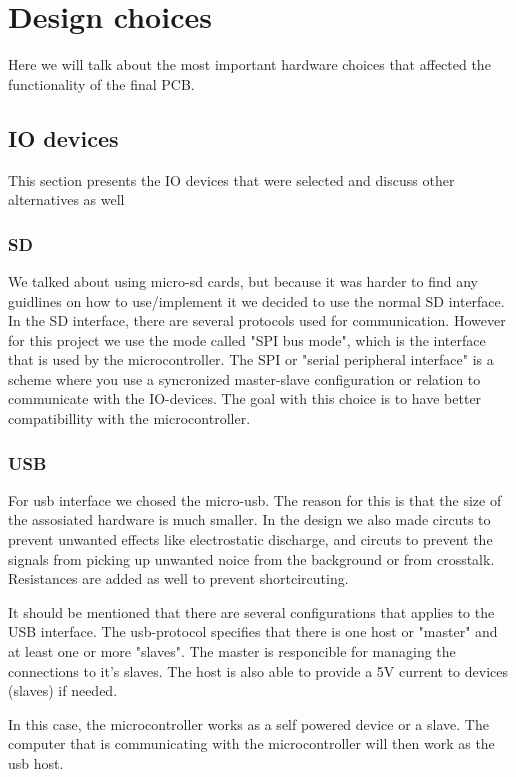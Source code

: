 \section {Design choices}

Here we will talk about the most important hardware choices that affected the functionality of the final PCB.

\subsection{IO devices} \label{pcb:design-choices:ss:IO_devices}
This section presents the IO devices that were selected and discuss other alternatives as well

\subsubsection{SD}
We talked about using micro-sd cards, but because it was harder to find any guidlines on how to use/implement it we decided to use the normal SD interface.
In the SD interface, there are several protocols used for communication. 
However for this project we use the mode called "SPI bus mode", which is the interface that is used by the microcontroller.  
The SPI or "serial peripheral interface" is a scheme where you use a syncronized master-slave configuration or relation to communicate with the IO-devices. 
The goal with this choice is to have better compatibillity with the microcontroller.

\subsubsection{USB}
For usb interface we chosed the micro-usb. 
The reason for this is that the size of the assosiated hardware is much smaller.
In the design we also made circuts to prevent unwanted effects like electrostatic discharge, and circuts to prevent the signals from picking up unwanted noice from the background or from crosstalk.
Resistances are added as well to prevent shortcircuting.

It should be mentioned that there are several configurations that applies to the USB interface. The usb-protocol
specifies that there is one host or "master" and at least one or more "slaves". The master is responcible for managing the connections
to it's slaves. The host is also able to provide a 5V current to devices (slaves) if needed.

In this case, the microcontroller works as a self powered device or a slave. The computer that is communicating with the microcontroller
will then work as the usb host.

